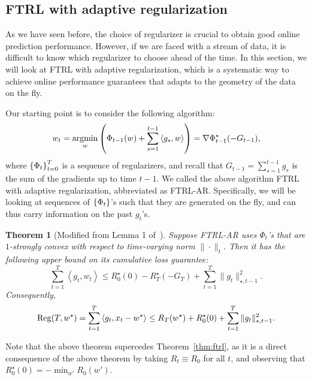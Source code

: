 \documentclass{article}
\newtheorem{theorem}{Theorem}
\DeclareMathOperator*{\Reg}{{\rm Reg}}
\DeclareMathOperator*{\argmin}{{\rm argmin}}
\newcommand{\inner}[2]{\left\langle #1,#2 \right\rangle}
\begin{document}
\subsection{FTRL with adaptive regularization}
As we have seen before, the choice of regularizer is crucial to obtain good online prediction performance. However, if we are faced with a stream of data, it is difficult to know which regularizer to choose ahead of the time.
In this section, we will look at FTRL with adaptive regularization, which is a systematic way to achieve online performance guarantees that adapts to the geometry of the data on the fly.

Our starting point is to consider the following algorithm:
\[ w_t = \argmin_w \del{ \Phi_{t-1}(w) + \sum_{s=1}^{t-1} \inner{g_s}{w} } = \nabla \Phi_{t-1}^\star(-G_{t-1}), \]
where $\cbr{\Phi_{t}}_{t=0}^T$ is a sequence of regularizers, and
recall that $G_{t-1} = \sum_{s=1}^{t-1} g_s$ is the sum of the gradients up to time $t-1$.
We called the above algorithm FTRL with adaptive regularization, abbreviated as FTRL-AR.
Specifically, we will be looking at sequences of $\cbr{\Phi_t}$'s such that they are generated on the fly, and can thus carry information on the past $g_t$'s.

\begin{theorem}[Modified from Lemma 1 of~\cite{orabona2015generalized}]
Suppose FTRL-AR uses $\Phi_t$'s that are $1$-strongly convex with respect to time-varying norm $\| \cdot \|_{t}$.
Then it has the following upper bound on its cumulative loss guarantee:
\[ \sum_{t=1}^T \inner{g_t}{w_t} \leq R_0^\star(0) - R_T^\star(-G_T) + \sum_{t=1}^T \| g_t \|_{\star, t-1}^2. \]
Consequently,
\[ \Reg(T, w^\star) = \sum_{t=1}^T \inner{g_t}{x_t - w^\star} \leq R_T(w^\star) + R_0^\star(0) + \sum_{t=1}^T \| g_t \|_{\star, t-1}^2. \]
\label{thm:ftrl-ar}
\end{theorem}

Note that the above theorem supercedes Theorem~\ref{thm:ftrl}, as it is a direct consequence of the above theorem by taking $R_t \equiv R_0$ for all $t$, and observing that $R_0^\star(0) = -\min_{w'} R_0(w')$.
\end{document}
